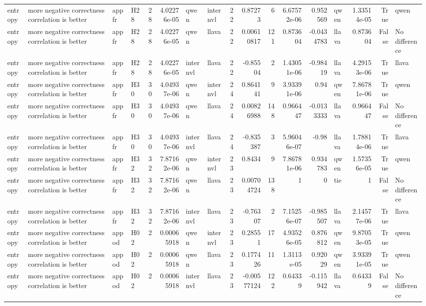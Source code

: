 \begin{longtable}{llllrrllrrrrrlrrl}
entropy & more negative correctness correlation is better & appfr & H28 & 28 & 4.02276e-05 & qwen & internvl & 22 & 0.87273 & 6 & 6.67572e-06 & 0.952569 & qwen & 1.33514e-05 & True & qwen \\
entropy & more negative correctness correlation is better & appfr & H28 & 28 & 4.02276e-05 & qwen & llava & 22 & 0.00610817 & 121 & 0.873604 & -0.0434783 & llava & 0.873604 & False & No difference \\
entropy & more negative correctness correlation is better & appfr & H28 & 28 & 4.02276e-05 & internvl & llava & 22 & -0.85504 & 2 & 1.43051e-06 & -0.98419 & llava & 4.29153e-06 & True & llava \\
entropy & more negative correctness correlation is better & appfr & H30 & 30 & 4.04937e-06 & qwen & internvl & 24 & 0.864141 & 9 & 3.93391e-06 & 0.94 & qwen & 7.86781e-06 & True & qwen \\
entropy & more negative correctness correlation is better & appfr & H30 & 30 & 4.04937e-06 & qwen & llava & 24 & 0.00826988 & 148 & 0.966447 & -0.0133333 & llava & 0.966447 & False & No difference \\
entropy & more negative correctness correlation is better & appfr & H30 & 30 & 4.04937e-06 & internvl & llava & 24 & -0.835387 & 3 & 5.96046e-07 & -0.98 & llava & 1.78814e-06 & True & llava \\
entropy & more negative correctness correlation is better & appfr & H32 & 32 & 7.87162e-06 & qwen & internvl & 23 & 0.8434 & 9 & 7.86781e-06 & 0.934783 & qwen & 1.57356e-05 & True & qwen \\
entropy & more negative correctness correlation is better & appfr & H32 & 32 & 7.87162e-06 & qwen & llava & 23 & 0.00704724 & 138 & 1 & 0 & tie & 1 & False & No difference \\
entropy & more negative correctness correlation is better & appfr & H32 & 32 & 7.87162e-06 & internvl & llava & 23 & -0.76307 & 2 & 7.15256e-07 & -0.985507 & llava & 2.14577e-06 & True & llava \\
entropy & more negative correctness correlation is better & appod & H02 & 2 & 0.00065918 & qwen & internvl & 23 & 0.28551 & 17 & 4.93526e-05 & 0.876812 & qwen & 9.87053e-05 & True & qwen \\
entropy & more negative correctness correlation is better & appod & H02 & 2 & 0.00065918 & qwen & llava & 23 & 0.177426 & 11 & 1.3113e-05 & 0.92029 & qwen & 3.93391e-05 & True & qwen \\
entropy & more negative correctness correlation is better & appod & H02 & 2 & 0.00065918 & internvl & llava & 23 & -0.00577124 & 122 & 0.64339 & -0.115942 & llava & 0.64339 & False & No difference \\

\end{longtable}
